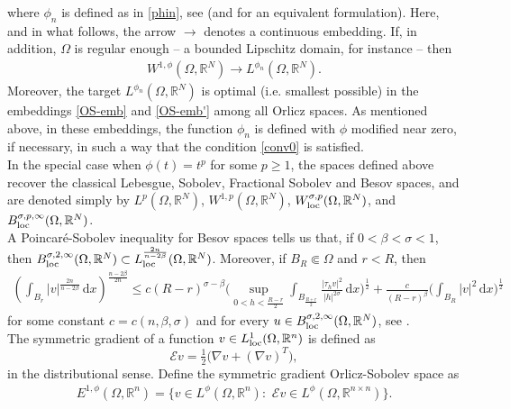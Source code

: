 \documentclass[leqno,11pt]{amsart}%
\numberwithin{equation}{section}
\def\R{\mathbb R}
\def\d{\mathrm{d}}
\def\E{\mathcal{E}}
\def\dx{\d x}
\theoremstyle{definition}
\numberwithin{equation}{section}
\begin{document}
where $\phi_n$ is defined as in \eqref{phin},
 see \cite{cianchi_CPDE} (and \cite{cianchi_IUMJ} for an equivalent formulation). Here, and in what follows, the arrow $\to$ denotes a continuous embedding.
 If, in addition, $\Omega$ is regular enough -- a bounded Lipschitz domain, for instance -- then 
    \begin{align}
    \label{OS-emb'}
    W^{1,\phi}(\Omega, \mathbb R^N) \to L^{\phi_n}(\Omega, \mathbb R^N).
\end{align}
Moreover, the target $L^{\phi_n}(\Omega, \mathbb R^N)$ is optimal (i.e. smallest possible) in the embeddings \eqref{OS-emb} and \eqref{OS-emb'} among all Orlicz spaces. As mentioned above, in these embeddings, the function $\phi_n$ is defined with $\phi$ modified near zero, if necessary, in such a way that the condition \eqref{conv0} is satisfied. 
\\  In the special case when $\phi(t)=t^p$ for some $p \geq 1$, the spaces defined above recover the classical Lebesgue, Sobolev, Fractional Sobolev and Besov spaces, and are denoted simply by $L^p (\Omega, \mathbb R^N)$, $W^{1,p} (\Omega, \mathbb R^N)$, $W^{\sigma,p}_{\rm loc} (\Omega, \mathbb R^N)$, and $B^{\sigma, p, \infty}_{\rm loc}(\Omega, \mathbb R^N)$.
\\ 
{ A Poincar\'e-Sobolev inequality for Besov spaces tells us that, if $0<\beta < \sigma <1$, then
$B^{\sigma,2,\infty}_{\rm loc}(\Omega, \R^N) \subset L^{\frac{2n}{n-2\beta}}_{\rm loc}(\Omega, \R^N)$. Moreover, 
if $B_R\Subset\Omega$ and $r<R$, then
\begin{align}\label{besov-emb}
\left(\int_{B_{r}}|v|^{\frac{ {2n}}{ n-2\beta}}\,\dx  \right)^{\frac{n-2\beta}{2n}}
\leq  c(R-r)^{\sigma-\beta} \bigg(\sup_{0<h< \frac{R-r}{2}}\int_{B_{\frac{R+r}{2}}}\frac{|\tau_hv|^2}{|h|^{2\sigma}}\,\dx\bigg)^\frac 12+ \frac{c}{(R-r)^{\beta}} \bigg(\int_{B_{R}}|v|^2\,\dx\bigg)^\frac 12
\end{align}
for some constant $c=c(n,\beta,     \sigma)$ and for every $u \in B^{\sigma,2,\infty}_{\rm loc}(\Omega, \R^N)$, see \cite[Lemma 2.8]{GPS2}.}
\\
The symmetric gradient of a function $v \in L^1_{\rm loc}(\Omega, \mathbb R^n)$ is defined as
\begin{equation}
  \E v =\tfrac12\big(\nabla v+(\nabla v)^T\big),
\end{equation}
in the distributional sense. Define the symmetric gradient Orlicz-Sobolev space as
\begin{align}
    \label{sym-orliczsobolev}
    E^{1,\phi} (\Omega, \mathbb R^n)= \big\{v \in L^\phi (\Omega, \mathbb R^n):  \,\, \mathcal E v \in L^\phi(\Omega, \mathbb R^{n\times n})\big\}.
\end{align}
\end{document}

